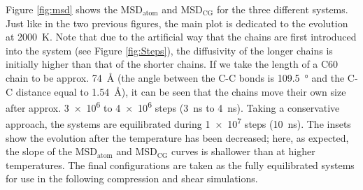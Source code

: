 \documentclass[aps,prb,reprint,superscriptaddress, a4paper]{revtex4-1}
\begin{document}
Figure \ref{fig:msd} shows the  $\text{MSD}_{\text{atom}}$ and $\text{MSD}_{\text{CG}}$ for the three different systems. Just like in the two previous figures, the main plot is dedicated to the evolution at  \SI{2000}{\kelvin}. Note that due to the artificial way that the chains are first introduced into the system (see Figure \ref{fig:Steps}), the diffusivity of the longer chains is initially higher than that of the shorter chains.  If we take the length of a C60 chain to be approx. \SI{74}{\angstrom} (the angle between the C-C bonds is \SI{109.5}{\degree} and the C-C distance equal to \SI{1.54}{\angstrom}),  it can be seen that the chains move their own size after approx. \SI{3e6}{} to  \SI{4e6}{} steps (\SI{3}{\nano\second} to \SI{4}{\nano\second}). Taking a conservative approach, the systems are equilibrated during  \SI{1e7}{} steps (\SI{10}{\nano\second}). The insets show the evolution after the temperature has been decreased; here, as expected, the slope of the $\text{MSD}_{\text{atom}}$ and $\text{MSD}_{\text{CG}}$ curves is shallower than at higher temperatures. The final configurations are taken as the fully equilibrated systems for use in the following compression and shear simulations.
\end{document}

